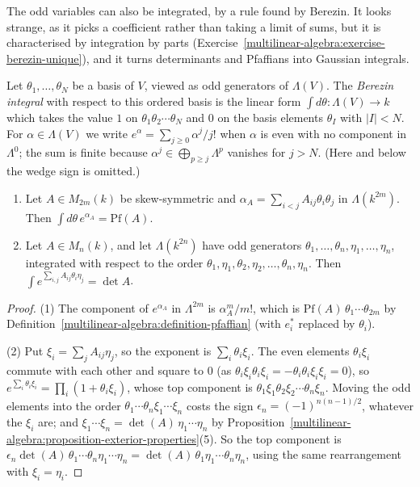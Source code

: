 The odd variables can also be integrated, by a rule found by Berezin. It looks strange, as it picks a coefficient rather than taking a limit of sums, but it is characterised by integration by parts
(Exercise~\ref{multilinear-algebra:exercise-berezin-unique}), and it turns determinants and Pfaffians into Gaussian integrals.

\begin{definition}\label{multilinear-algebra:definition-berezin}
Let $\theta_1, \ldots, \theta_N$ be a basis of $V$, viewed as odd generators of $\Lambda(V)$. The \emph{Berezin integral} with respect to this ordered basis is the linear form $\int d\theta \colon \Lambda(V) \to k$ which
takes the value $1$ on $\theta_1\theta_2 \cdots \theta_N$ and $0$ on the basis elements $\theta_I$ with $|I| < N$. For $\alpha \in \Lambda(V)$ we write $e^\alpha = \sum_{j \geq 0}\alpha^j/j!$ when $\alpha$ is even with no component in
$\Lambda^0$; the sum is finite because $\alpha^j \in \bigoplus_{p \geq j}\Lambda^p$ vanishes for $j > N$. (Here and below the wedge sign is omitted.)
\end{definition}

\begin{proposition}\label{multilinear-algebra:proposition-fermionic-gaussian}
\begin{enumerate}
\item Let $A \in M_{2m}(k)$ be skew-symmetric and $\alpha_A = \sum_{i < j}A_{ij}\theta_i\theta_j$ in $\Lambda(k^{2m})$. Then $\int d\theta\,e^{\alpha_A} = \mathrm{Pf}(A)$.
\item Let $A \in M_n(k)$, and let $\Lambda(k^{2n})$ have odd generators $\theta_1, \ldots, \theta_n, \eta_1, \ldots, \eta_n$, integrated with respect to the order $\theta_1, \eta_1, \theta_2, \eta_2, \ldots, \theta_n, \eta_n$. Then
$\int e^{\sum_{i,j}A_{ij}\theta_i\eta_j} = \det A$.
\end{enumerate}
\end{proposition}

\begin{proof}
(1) The component of $e^{\alpha_A}$ in $\Lambda^{2m}$ is $\alpha_A^m/m!$, which is $\mathrm{Pf}(A)\,\theta_1 \cdots \theta_{2m}$ by Definition~\ref{multilinear-algebra:definition-pfaffian} (with $e_i^*$ replaced by $\theta_i$).

(2) Put $\xi_i = \sum_jA_{ij}\eta_j$, so the exponent is $\sum_i\theta_i\xi_i$. The even elements $\theta_i\xi_i$ commute with each other and square to $0$ (as $\theta_i\xi_i\theta_i\xi_i = -\theta_i\theta_i\xi_i\xi_i = 0$), so
$e^{\sum_i\theta_i\xi_i} = \prod_i(1 + \theta_i\xi_i)$, whose top component is $\theta_1\xi_1\theta_2\xi_2 \cdots \theta_n\xi_n$. Moving the odd elements into the order $\theta_1 \cdots \theta_n\xi_1 \cdots \xi_n$ costs the
sign $\epsilon_n = (-1)^{n(n-1)/2}$, whatever the $\xi_i$ are; and $\xi_1 \cdots \xi_n = \det(A)\,\eta_1 \cdots \eta_n$ by Proposition~\ref{multilinear-algebra:proposition-exterior-properties}(5). So the top component is
$\epsilon_n\det(A)\,\theta_1 \cdots \theta_n\eta_1 \cdots \eta_n = \det(A)\,\theta_1\eta_1 \cdots \theta_n\eta_n$, using the same rearrangement with $\xi_i = \eta_i$.
\end{proof}

